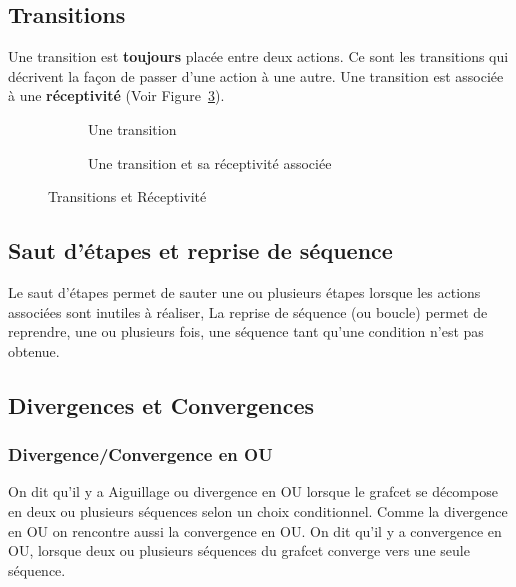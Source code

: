 \subsection{Transitions}

Une transition est \textbf{toujours} placée entre deux actions. Ce sont les transitions qui décrivent la façon de passer d'une action à une autre.
Une transition est associée à une \textbf{réceptivité} (Voir Figure~\ref{fig:transition}).


\begin{figure}[ht]
  \centering
  \begin{subfigure}[b]{.48\textwidth}
    \centering
    \caption{Une transition}
    \label{fig:transition}
  \end{subfigure}
  \begin{subfigure}[b]{.48\textwidth}
    \centering
    \caption{Une transition et sa réceptivité associée}
    \label{fig:transitionEtRecept}
  \end{subfigure}
  \caption{Transitions et Réceptivité}
  \label{fig:transition}
\end{figure}

\subsection{Saut d'étapes et reprise de séquence}
Le saut d'étapes permet de sauter une ou plusieurs étapes lorsque les actions associées sont inutiles à réaliser, La reprise de séquence (ou boucle) permet de reprendre, une ou plusieurs fois, une séquence tant qu'une condition n'est pas obtenue.


\subsection{Divergences et Convergences}
\subsubsection{Divergence/Convergence en OU}
On dit qu'il y a Aiguillage ou divergence en OU lorsque le grafcet se décompose en deux ou plusieurs séquences selon un choix conditionnel. Comme la divergence en OU on rencontre aussi la convergence en OU. On dit qu'il y a convergence en OU, lorsque deux ou plusieurs séquences du grafcet converge vers une seule séquence.

